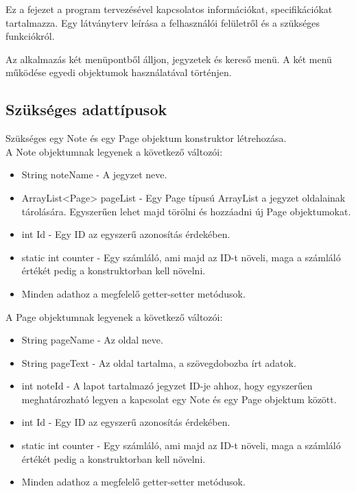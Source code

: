 Ez a fejezet a program tervezésével kapcsolatos információkat, specifikációkat tartalmazza. Egy látványterv leírása a felhasználói felületről és a szükséges funkciókról.


Az alkalmazás két menüpontből álljon, jegyzetek és kereső menü. A két menü működése egyedi objektumok használatával történjen.

\subsection{Szükséges adattípusok}
Szükséges egy Note és egy Page objektum konstruktor létrehozása.
\\A Note objektumnak legyenek a következő változói:
\begin{itemize}
	\item String noteName - A jegyzet neve.
	\item ArrayList<Page> pageList - Egy Page típusú ArrayList a jegyzet oldalainak tárolására. Egyszerűen lehet majd törölni és hozzáadni új Page objektumokat.
	\item int Id - Egy ID az egyszerű azonosítás érdekében.
	\item static int counter - Egy számláló, ami majd az ID-t növeli, maga a számláló értékét pedig a konstruktorban kell növelni.
	\item Minden adathoz a megfelelő getter-setter metódusok.
\end{itemize}

\vspace{10pt} \noindent A Page objektumnak legyenek a következő változói:
\begin{itemize}
	\item String pageName - Az oldal neve.
	\item String pageText - Az oldal tartalma, a szövegdobozba írt adatok.
	\item int noteId - A lapot tartalmazó jegyzet ID-je ahhoz, hogy egyszerűen meghatározható legyen a kapcsolat egy Note és egy Page objektum között.
	\item int Id - Egy ID az egyszerű azonosítás érdekében.
	\item static int counter - Egy számláló, ami majd az ID-t növeli, maga a számláló értékét pedig a konstruktorban kell növelni.
	\item Minden adathoz a megfelelő getter-setter metódusok.
\end{itemize}

